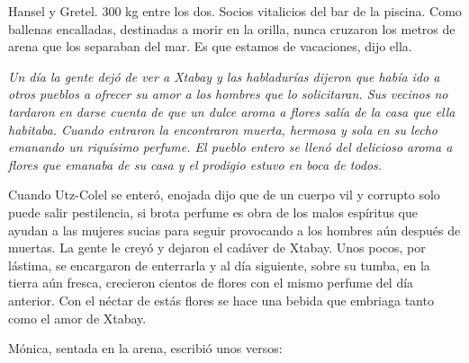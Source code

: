 \documentclass[12pt,twoside,openright,a5paper]{book}
\begin{document}
\vspace{0.5cm}

\hrulefill\hspace{0.2cm} \decofourleft\decofourright \hspace{0.2cm} \hrulefill
\vspace{0.5cm}

Hansel y Gretel. 300 kg entre los dos. Socios vitalicios del bar de la
piscina. Como ballenas encalladas, destinadas a morir en la orilla, nunca
cruzaron los metros de arena que los separaban del mar. Es que estamos de
vacaciones, dijo ella.

\vspace{0.5cm}

\hrulefill\hspace{0.2cm} \decofourleft\decofourright \hspace{0.2cm} \hrulefill
\vspace{0.5cm}

{\em Un día la gente dejó de ver a Xtabay y las habladurías dijeron
que había ido a otros pueblos a ofrecer su amor a los hombres que lo
solicitaran. Sus vecinos no tardaron en darse cuenta de que un dulce aroma
a flores salía de la casa que ella habitaba. Cuando entraron la encontraron
muerta, hermosa y sola en su lecho emanando un riquísimo perfume. El pueblo
entero se llenó del delicioso aroma a flores que emanaba de su casa y el
prodigio estuvo en boca de todos.

Cuando Utz-Colel se enteró, enojada dijo que de un cuerpo vil y corrupto solo
puede salir pestilencia, si brota perfume es obra de los malos espíritus
que ayudan a las mujeres sucias para seguir provocando a los hombres aún
después de muertas. La gente le creyó y dejaron el cadáver de Xtabay. Unos
pocos, por lástima, se encargaron de enterrarla y al día siguiente,
sobre su tumba, en la tierra aún fresca, crecieron cientos de flores con
el mismo perfume del día anterior. Con el néctar de estás flores se hace
una bebida que embriaga tanto como el amor de Xtabay.}

\vspace{0.5cm}

\hrulefill\hspace{0.2cm} \decofourleft\decofourright \hspace{0.2cm} \hrulefill
\vspace{0.5cm}

Mónica, sentada en la arena, escribió unos versos: 
\end{document}
